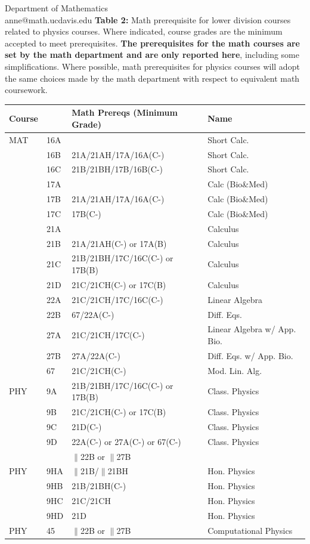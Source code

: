 \documentclass[letterpaper,12pt]{letter}
\begin{document}
\begin{letter}{Department of Mathematics \\ anne@math.ucdavis.edu}
{\bf Table 2:}  Math prerequisite for lower division courses related to physics
courses.  Where indicated, course grades are the minimum accepted to
meet prerequisites.  {\bf The prerequisites for the math courses are
  set by the math department and are only reported here}, including
some simplifications.  Where possible, math prerequisites for physics
courses will adopt the same choices made by the math department with
respect to equivalent math coursework.
\begin{center}
\begin{tabular}{|llll|}
\hline
Course & & Math Prereqs (Minimum Grade)& Name \\
\hline
MAT & 16A & & Short Calc.\\
    & 16B & 21A/21AH/17A/16A(C-) & Short Calc.\\
    & 16C & 21B/21BH/17B/16B(C-) & Short Calc.\\
    & 17A &                      & Calc (Bio\&Med)\\
    & 17B & 21A/21AH/17A/16A(C-) & Calc (Bio\&Med)\\
    & 17C & 17B(C-)              & Calc (Bio\&Med)\\
    & 21A &                      & Calculus \\
    & 21B & 21A/21AH(C-) or 17A(B) & Calculus \\
    & 21C & 21B/21BH/17C/16C(C-) or 17B(B) & Calculus\\
    & 21D & 21C/21CH(C-) or 17C(B)  & Calculus \\
    & 22A & 21C/21CH/17C/16C(C-)    & Linear Algebra \\
    & 22B & 67/22A(C-)              & Diff. Eqs. \\
    & 27A & 21C/21CH/17C(C-)        & Linear Algebra w/ App. Bio. \\
    & 27B & 27A/22A(C-)             & Diff. Eqs. w/ App. Bio.\\
    & 67  & 21C/21CH(C-)            & Mod. Lin. Alg. \\
\hline
\hline
PHY & 9A & 21B/21BH/17C/16C(C-) or 17B(B) & Class. Physics\\
    & 9B & 21C/21CH(C-) or 17C(B) & Class. Physics\\
    & 9C & 21D(C-) & Class. Physics\\
    & 9D & 22A(C-) or 27A(C-) or 67(C-) & Class. Physics\\
    &    & $\parallel$22B or $\parallel$27B & \\
\hline
\hline
PHY & 9HA & $\parallel$21B/$\parallel$21BH & Hon. Physics\\
    & 9HB    & 21B/21BH(C-) & Hon. Physics \\
    & 9HC    & 21C/21CH & Hon. Physics \\
    & 9HD    & 21D  & Hon. Physics \\
\hline
PHY & 45     & $\parallel$22B or $\parallel$27B & Computational Physics \\
\hline
\end{tabular}
\end{center}
\newpage


\end{letter}
\end{document}

